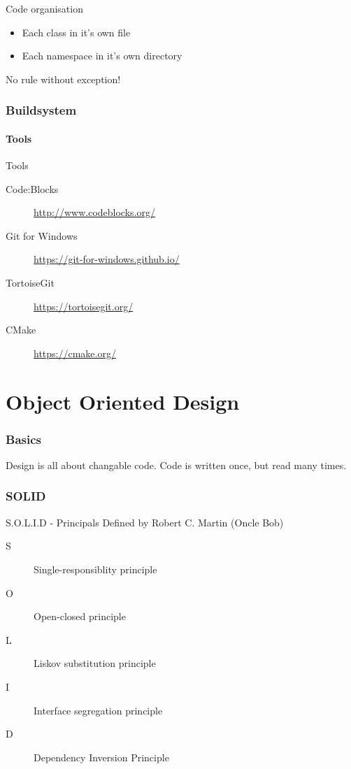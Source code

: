 \documentclass{beamer}
\begin{document}
\begin{frame}{Code organisation}
\begin{itemize}
  \item Each class in it's own file
  \item Each namespace in it's own directory
\end{itemize}
No rule without exception!
\end{frame}


\section{Buildsystem}
\subsection{Tools}
\begin{frame}{Tools}
\begin{description}
  \item[Code:Blocks] \url{http://www.codeblocks.org/}
  \item[Git for Windows] \url{https://git-for-windows.github.io/}
  \item[TortoiseGit] \url{https://tortoisegit.org/}
  \item[CMake] \url{https://cmake.org/}  
\end{description}
\end{frame}


\part{Object Oriented Design}

\section{Basics}

\begin{frame}
Design is all about changable code.
Code is written once, but read many times.
\end{frame}


\section{SOLID}

\begin{frame}{S.O.L.I.D - Principals}
Defined by Robert C. Martin (Oncle Bob)

\begin{description}
\item [S] Single-responsiblity principle
\item [O] Open-closed principle
\item [L] Liskov substitution principle
\item [I] Interface segregation principle
\item [D] Dependency Inversion Principle
\end{description}
\end{frame}
\end{document}
